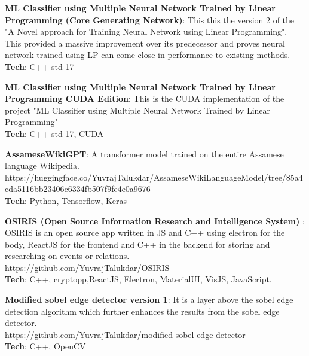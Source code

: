 \documentclass[a4paper,20pt]{article}
\newcommand{\resumeItem}[2]{
  \item\small{
    \textbf{#1}{: #2 \vspace{-2pt}}
  }
}
\newcommand{\resumeSubItem}[2]{\resumeItem{#1}{#2}\vspace{-3pt}}
\begin{document}
\resumeSubItem{ML Classifier using Multiple Neural Network Trained by Linear Programming (Core Generating Network)}{This this the version 2 of the "A Novel approach for Training Neural Network using Linear Programming". This provided a massive improvement over its predecessor and proves neural network trained using LP can come close in performance to existing methods.\\\textbf{Tech}: C++ std 17}
\vspace{2pt}

\resumeSubItem{ML Classifier using Multiple Neural Network Trained by Linear Programming CUDA Edition}{This is the CUDA implementation of the project "ML Classifier using Multiple Neural Network Trained by Linear Programming" \\\textbf{Tech}: C++ std 17, CUDA}
\vspace{2pt}

\resumeSubItem{AssameseWikiGPT}{A transformer model trained on the entire Assamese language Wikipedia. https://huggingface.co/YuvrajTalukdar/AssameseWikiLanguageModel/tree/85a4cda5116bb23406c6334fb507f9fe4e0a9676 \\\textbf{Tech}: Python, Tensorflow, Keras}
\vspace{2pt}


\resumeSubItem{OSIRIS (Open Source Information Research and Intelligence System)
}{OSIRIS is an open source app written in JS and C++ using electron for the body, ReactJS for the frontend and C++ in the backend for storing and researching on events or relations.\\ 
https://github.com/YuvrajTalukdar/OSIRIS \\ \textbf{Tech}: C++, cryptopp,ReactJS, Electron, MaterialUI, VisJS, JavaScript.}

\resumeSubItem{Modified sobel edge detector version 1}{It is a layer above the sobel edge detection algorithm which further enhances the results from the sobel edge detector.\\ 
https://github.com/YuvrajTalukdar/modified-sobel-edge-detector 
\\\textbf{Tech}: C++, OpenCV }\vspace{2pt}
\end{document}
